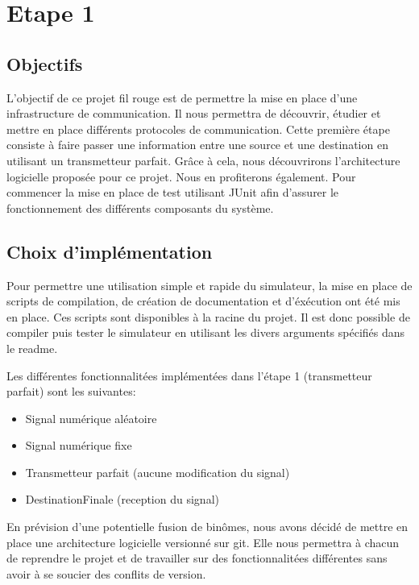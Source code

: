 \section{Etape 1}
\subsection{Objectifs}

L'objectif de ce projet fil rouge est de permettre la mise en place d'une infrastructure de communication.
Il nous permettra de découvrir, étudier et mettre en place différents protocoles de communication. Cette première étape
consiste à faire passer une information entre une source et une destination en utilisant
un transmetteur parfait. Grâce à cela, nous découvrirons l'architecture logicielle proposée pour ce projet. Nous en profiterons également.
Pour commencer la mise en place de test utilisant JUnit afin d'assurer le fonctionnement des différents composants du système.

\subsection{Choix d'implémentation}

Pour permettre une utilisation simple et rapide du simulateur, la mise en place de scripts de compilation, de création de documentation et d'éxécution
ont été mis en place. Ces scripts sont disponibles à la racine du projet.
Il est donc possible de compiler puis tester le simulateur en utilisant les divers arguments spécifiés dans le readme.

Les différentes fonctionnalitées implémentées dans l'étape 1 (transmetteur parfait) sont les suivantes:
\begin{itemize}
    \item Signal numérique aléatoire
    \item Signal numérique fixe
    \item Transmetteur parfait (aucune modification du signal)
    \item DestinationFinale (reception du signal)
\end{itemize}

En prévision d'une potentielle fusion de binômes, nous avons décidé de mettre en place une architecture logicielle versionné sur git.
Elle nous permettra à chacun de reprendre le projet et de travailler sur des fonctionnalitées différentes sans avoir à se soucier des conflits de version.

\pagebreak

